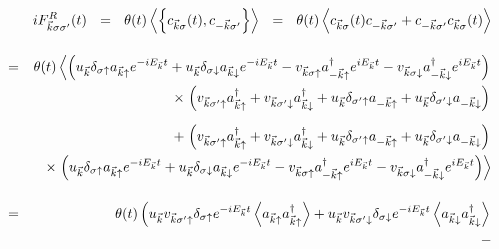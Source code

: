 \documentclass[uplatex,a4j,12pt,dvipdfmx]{jsarticle}
\begin{document}
\begin{eqnarray}
	&&
	i
	F_{\vec{k} \sigma \sigma'}^{R}(t)
	\ \ = \ \
	\theta(t)
	\left\langle \left\{
	c_{\vec{k} \sigma}(t), c_{-\vec{k} \sigma'}
	\right\} \right\rangle
	\ \ = \ \
	\theta(t)
	\left\langle
	c_{\vec{k} \sigma}(t) c_{-\vec{k} \sigma'}
	+
	c_{-\vec{k} \sigma'} c_{\vec{k} \sigma}(t)
	\right\rangle
	\nonumber \\[4mm] &=&
	\theta(t)
	\left\langle
	\left(
	u_{ \vec{k} } \delta_{ \sigma \uparrow } a_{\vec{k} \uparrow} e^{- i E_{\vec{k}} t}
	+
	u_{ \vec{k} } \delta_{ \sigma \downarrow } a_{\vec{k} \downarrow} e^{- i E_{\vec{k}} t}
	-
	v_{\vec{k} \sigma \uparrow} a_{-\vec{k} \uparrow}^{\dagger} e^{ i E_{\vec{k}} t}
	-
	v_{\vec{k} \sigma \downarrow} a_{-\vec{k} \downarrow}^{\dagger} e^{ i E_{\vec{k}} t}
	\right)
	\right.
	\nonumber \\ && \times
	\left.
	\left(
	v_{\vec{k} \sigma' \uparrow} a_{\vec{k} \uparrow}^{\dagger}
	+
	v_{\vec{k} \sigma' \downarrow} a_{\vec{k} \downarrow}^{\dagger}
	+
	u_{\vec{k}} \delta_{\sigma' \uparrow} a_{-\vec{k} \uparrow}
	+
	u_{\vec{k}} \delta_{\sigma' \downarrow} a_{-\vec{k} \downarrow}
	\right)
	\right.
	\nonumber \\[2mm] && \hspace{5mm} +
	\left.
	\left(
	v_{\vec{k} \sigma' \uparrow} a_{\vec{k} \uparrow}^{\dagger}
	+
	v_{\vec{k} \sigma' \downarrow} a_{\vec{k} \downarrow}^{\dagger}
	+
	u_{\vec{k}} \delta_{\sigma' \uparrow} a_{-\vec{k} \uparrow}
	+
	u_{\vec{k}} \delta_{\sigma' \downarrow} a_{-\vec{k} \downarrow}
	\right)
	\right.
	\nonumber \\ && \times
	\left.
	\left(
	u_{ \vec{k} } \delta_{ \sigma \uparrow } a_{\vec{k} \uparrow} e^{- i E_{\vec{k}} t}
	+
	u_{ \vec{k} } \delta_{ \sigma \downarrow } a_{\vec{k} \downarrow} e^{- i E_{\vec{k}} t}
	-
	v_{\vec{k} \sigma \uparrow} a_{-\vec{k} \uparrow}^{\dagger} e^{ i E_{\vec{k}} t}
	-
	v_{\vec{k} \sigma \downarrow} a_{-\vec{k} \downarrow}^{\dagger} e^{ i E_{\vec{k}} t}
	\right)
	\right\rangle
	\nonumber \\[4mm]
	&=&
	\theta(t)
	\left(
	u_{\vec{k}}
	v_{\vec{k} \sigma' \uparrow}
	\delta_{\sigma \uparrow}
	e^{ - i E_{\vec{k}} t }
	\left\langle
	a_{\vec{k} \uparrow}
	a_{\vec{k} \uparrow}^{\dagger}
	\right\rangle
	+
	u_{\vec{k}}
	v_{\vec{k} \sigma' \downarrow}
	\delta_{\sigma \downarrow}
	e^{ - i E_{\vec{k}} t }
	\left\langle
	a_{\vec{k} \downarrow}
	a_{\vec{k} \downarrow}^{\dagger}
	\right\rangle
	\right.
	\nonumber \\ && \hspace{4mm} -

\end{eqnarray}
\end{document}
